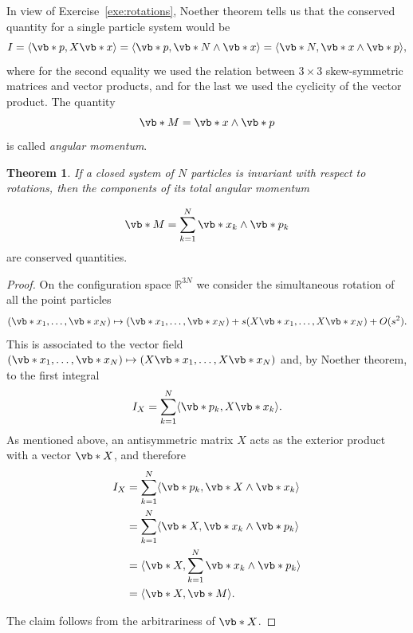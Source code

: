 \documentclass[english,fontsize=11pt,paper=b5]{scrbook}
\numberwithin{equation}{chapter}
\newtheorem{theorem}{Theorem}[chapter]
\theoremstyle{definition}
\begin{document}
    In view of Exercise~\ref{exe:rotations}, Noether theorem tells us that the conserved quantity for a single particle system would be
    \begin{equation}
      I = \langle\vb*{p}, X\vb*{x}\rangle = \langle\vb*{p}, \vb*{N}\wedge \vb*{x}\rangle = \langle\vb*{N}, \vb*{x}\wedge \vb*{p} \rangle,
    \end{equation}
    where for the second equality we used the relation between $3\times3$ skew-symmetric matrices and vector products, and for the last we used the cyclicity of the vector product.
    The quantity
    \begin{equation}
      \vb*{M} = \vb*{x} \wedge \vb*{p}
    \end{equation}
    is called \emph{angular momentum}.

    \begin{theorem}
      If a closed system of $N$ particles is invariant with respect to rotations, then the components of its \emph{total angular momentum}
    \end{theorem}
    \begin{equation}
      \vb*{M} = \sum_{k=1}^N \vb*{x}_k \wedge \vb*{p}_k
    \end{equation}
    are conserved quantities.
    \begin{proof}
      On the configuration space $\mathbb{R}^{3N}$ we consider the simultaneous rotation of all the point particles
      \begin{equation}
        (\vb*{x}_1,\ldots,\vb*{x}_N) \mapsto
        (\vb*{x}_1,\ldots,\vb*{x}_N) +
        s (X\vb*{x}_1,\ldots,X\vb*{x}_N) + O(s^2).
      \end{equation}
      This is associated to the vector field $(\vb*{x}_1,\ldots,\vb*{x}_N) \mapsto (X\vb*{x}_1,\ldots,X\vb*{x}_N)$ and, by Noether theorem, to the first integral
      \begin{equation}
        I_X = \sum_{k=1}^N \langle\vb*{p}_k, X\vb*{x}_k\rangle.
      \end{equation}
      As mentioned above, an antisymmetric matrix $X$ acts as the exterior product with a vector $\vb*{X}$, and therefore
      \begin{align}
        I_X & = \sum_{k=1}^N \langle\vb*{p}_k, \vb*{X}\wedge\vb*{x}_k\rangle  \\
            & = \sum_{k=1}^N \langle\vb*{X}, \vb*{x}_k\wedge \vb*{p}_k\rangle \\
            & = \langle\vb*{X}, \sum_{k=1}^N \vb*{x}_k\wedge \vb*{p}_k\rangle \\
            & = \langle\vb*{X},\vb*{M}\rangle.
      \end{align}

      The claim follows from the arbitrariness of $\vb*{X}$.
    \end{proof}
\end{document}
